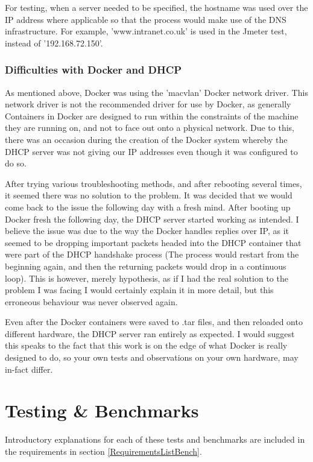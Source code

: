 For testing, when a server needed to be specified, the hostname was used over the IP address where applicable so that the process would make use of the DNS infrastructure. For example, 'www.intranet.co.uk' is used in the Jmeter test, instead of '192.168.72.150'.

\subsection{Difficulties with Docker and DHCP}
As mentioned above, Docker was using the 'macvlan' Docker network driver. This network driver is not the recommended driver for use by Docker, as generally Containers in Docker are designed to run within the constraints of the machine they are running on, and not to face out onto a physical network. Due to this, there was an occasion during the creation of the Docker system whereby the DHCP server was not giving our IP addresses even though it was configured to do so.

After trying various troubleshooting methods, and after rebooting several times, it seemed there was no solution to the problem. It was decided that we would come back to the issue the following day with a fresh mind. After booting up Docker fresh the following day, the DHCP server started working as intended. I believe the issue was due to the way the Docker handles replies over IP, as it seemed to be dropping important packets headed into the DHCP container that were part of the DHCP handshake process (The process would restart from the beginning again, and then the returning packets would drop in a continuous loop). This is however, merely hypothesis, as if I had the real solution to the problem I was facing I would certainly explain it in more detail, but this erroneous behaviour was never observed again. 

Even after the Docker containers were saved to .tar files, and then reloaded onto different hardware, the DHCP server ran entirely as expected. I would suggest this speaks to the fact that this work is on the edge of what Docker is really designed to do, so your own tests and observations on your own hardware, may in-fact differ.

\chapter{Testing \& Benchmarks}
Introductory explanations for each of these tests and benchmarks are included in the requirements in section \ref{RequirementsListBench}.

